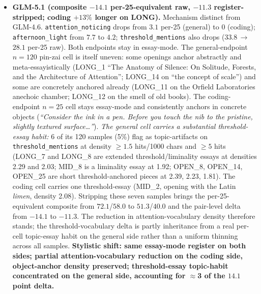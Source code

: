 \documentclass[11pt,a4paper]{article}
\begin{document}
\begin{sloppypar}
\begin{itemize}[leftmargin=2em, itemsep=0.3em, topsep=0.3em]
\item \textbf{GLM-5.1 (composite $-14.1$ per-25-equivalent raw, $-11.3$ register-stripped; coding $+13\%$ longer on LONG).} Mechanism distinct from GLM-4.6. \texttt{attention\allowbreak\_noticing} drops from $3.1$ per-25 (general) to $0$ (coding); \texttt{afternoon\_light} from $7.7$ to $4.2$; \texttt{threshold\_mentions} also drops ($33.8$\,$\rightarrow$\,$28.1$ per-25 raw). Both endpoints stay in essay-mode. The general-endpoint $n{=}120$ pin-zai cell is itself uneven: some openings anchor abstractly and meta-essayistically (LONG\_1 ``The Anatomy of Silence: On Solitude, Forests, and the Architecture of Attention''; LONG\_14 on ``the concept of scale'') and some are concretely anchored already (LONG\_11 on the Orfield Laboratories anechoic chamber; LONG\_12 on the smell of old books). The coding-endpoint $n{=}25$ cell stays essay-mode and consistently anchors in concrete objects (\emph{``Consider the ink in a pen. Before you touch the nib to the pristine, slightly textured surface\ldots''}). \emph{The general cell carries a substantial threshold-essay habit:} 6 of its 120 samples (5\%) flag as topic-artifacts on \texttt{threshold\_mentions} at density $\ge 1.5$ hits/1000 chars and $\ge 5$ hits (LONG\_7 and LONG\_8 are extended threshold/liminality essays at densities 2.29 and 2.03; MID\_8 is a liminality essay at 1.92; OPEN\_8, OPEN\_14, OPEN\_25 are short threshold-anchored pieces at 2.39, 2.23, 1.81). The coding cell carries one threshold-essay (MID\_2, opening with the Latin \emph{limen}, density 2.08). Stripping these seven samples brings the per-25-equivalent composite from $72.1$/$58.0$ to $51.3$/$40.0$ and the pair-level delta from $-14.1$ to $-11.3$. The reduction in attention-vocabulary density therefore stands; the threshold-vocabulary delta is partly inheritance from a real per-cell topic-essay habit on the general side rather than a uniform thinning across all samples. \textbf{Stylistic shift: same essay-mode register on both sides; partial attention-vocabulary reduction on the coding side, object-anchor density preserved; threshold-essay topic-habit concentrated on the general side, accounting for $\approx$3 of the $14.1$ point delta.}


\end{itemize}
\end{sloppypar}
\end{document}
